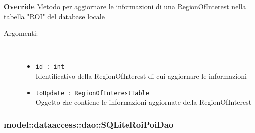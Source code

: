 \documentclass[../DefinizioneDiProdotto.tex]{subfiles}
\begin{document}
\begin{description}
\begin{itemize}
\textbf{Override} Metodo per aggiornare le informazioni di una RegionOfInterest nella tabella "ROI" del database locale
 \begin{description}
\item[Argomenti:] \
\begin{itemize}
\item \texttt{id : int}\\
Identificativo della RegionOfInterest di cui aggiornare le informazioni\item \texttt{toUpdate : RegionOfInterestTable}\\
Oggetto che contiene le informazioni aggiornate della RegionOfInterest\end{itemize}
\end{description}
\end{itemize}
\end{description}

\subsubsection{model::dataaccess::dao::SQLiteRoiPoiDao}
\end{document}
